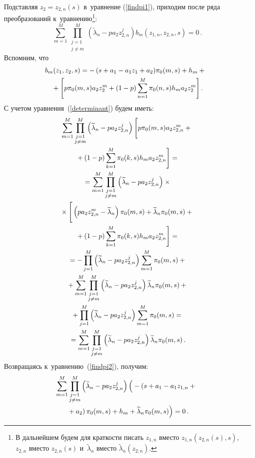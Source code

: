 \begin{multicols}{2}
Подставляя $z_2=z_{2,n}(s)$ в~уравнение (\ref{findpi1}), 
приходим после ряда преобразований 
к~уравнению\footnote{В дальнейшем будем для краткости писать $z_{1,n}$ 
вместо $z_{1,n}(z_{2,n}(s),s)$, $z_{2,n}$ вместо $z_{2,n}(s)$ 
и~$\widetilde{\lambda}_n$ вместо $\widetilde{\lambda}_n(z_{2,n})$.}:
\begin{equation}
\sum\limits_{m=1}^M
\prod\limits_{\substack{j=1\\j\neq m}}^M(\widetilde{\lambda}_n-
pa_2 z_{2,n}^j)b_m(z_{1,n},z_{2,n},s)=0\,.
\label{findpi2}
\end{equation}
Вспомним, что
\begin{multline*}
\hspace*{-5.5pt}b_m\!\left(z_1,z_2,s\right)=-\left(s+a_1-a_1 z_1+a_2\right)
\!\pi_0(m,s)+h_m+{}\\
{}+\left[p\pi_0(m,s)a_2 z_2^m+(1-p)
\sum\limits_{n=1}^{M}\pi_0(n,s)h_m a_2 z_2^m\right].
\end{multline*}
С учетом уравнения~(\ref{determinant}) будем иметь:
\begin{multline*}
\sum\limits_{m=1}^M\prod\limits_{\substack{j=1\\j\neq m}}^M
\left(\widetilde{\lambda}_n-pa_2 z_{2,n}^j\right)
\left[
\vphantom{\sum\limits_{k=1}^{M}}
p\pi_0(m,s)a_2 z_{2,n}^m+{}\right.\\
\left.{}+(1-p)
\sum\limits_{k=1}^{M}\pi_0(k,s)h_m a_2 z_{2,n}^m\right]={}\\
{}=\sum\limits_{m=1}^M
\prod\limits_{\substack{j=1\\j\neq m}}^M
\left(\widetilde{\lambda}_n-pa_2 z_{2,n}^j\right)\times{}\\
{}\times
\left[
\vphantom{\sum\limits_{k=1}^{M}}
\left(pa_2 z_{2,n}^m-\widetilde{\lambda}_n\right)
\pi_0(m,s)+\widetilde{\lambda}_n \pi_0(m,s)+{}\right.\\
\left.{}+(1-p)
\sum\limits_{k=1}^{M}\pi_0(k,s)h_m a_2 z_{2,n}^m\right]={}\\
{}=-\prod\limits_{j=1}^M\left(\widetilde{\lambda}_n-pa_2 z_{2,n}^j\right)
\sum\limits_{m=1}^M \pi_0(m,s)+{}\\
{}+
\sum\limits_{m=1}^M
\prod\limits_{\substack{j=1\\j\neq m}}^M\left(\widetilde{\lambda}_n-pa_2 z_{2,n}^j\right)
\widetilde{\lambda}_n \pi_0(m,s)+{}\\
{}+\prod\limits_{j=1}^M
\left(\widetilde{\lambda}_n-pa_2 z_{2,n}^j\right)
\sum\limits_{m=1}^M \pi_0(m,s)={}\\
{}=
\sum\limits_{m=1}^M
\prod\limits_{\substack{j=1\\j\neq m}}^M\left(\widetilde{\lambda}_n-pa_2 z_{2,n}^j\right)
\widetilde{\lambda}_n \pi_0(m,s)\,.
\end{multline*}
Возвращаясь к~уравнению~(\ref{findpi2}), получим:
\begin{multline*}
\sum\limits_{m=1}^M
\prod\limits_{\substack{j=1\\j\neq m}}^M\left(\widetilde{\lambda}_n-pa_2 z_{2,n}^j\right)
\left(
\vphantom{\widetilde{\lambda}_n}
-\left(s+a_1-a_1 z_{1,n}+{}\right.\right.\\
\left.\left.{}+a_2\right)\pi_0(m,s)+
h_m+\widetilde{\lambda}_n \pi_0(m,s)\right)=0\,.
\end{multline*}


\end{multicols}
